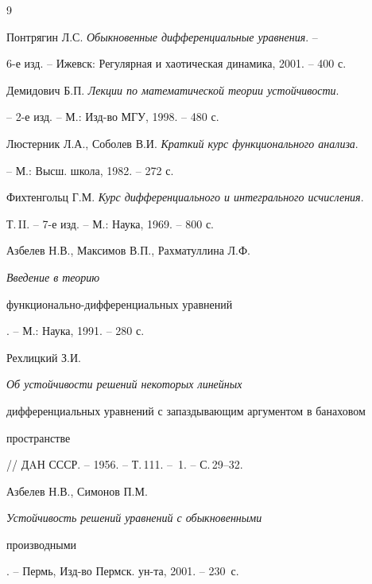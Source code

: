 \begin{thebibliography}{9} 


 




Понтрягин Л.С. {\em Обыкновенные дифференциальные уравнения}. -- 


6-е изд. -- Ижевск: Регулярная и хаотическая динамика, 2001. -- 400 с. 




Демидович Б.П. {\em Лекции по математической теории устойчивости}. 


-- 2-е изд. -- М.: Изд-во МГУ, 1998. -- 480 с. 




Люстерник Л.А., Соболев В.И. {\em Краткий курс функционального анализа}. 


-- М.: Высш. школа, 1982. -- 272 с. 




Фихтенгольц Г.М. {\em Курс дифференциального и интегрального исчисления}. 


Т.\,II. -- 7-е изд. -- М.: Наука, 1969. -- 800 с. 




Азбелев Н.В., Максимов В.П., Рахматуллина Л.Ф. {\em Введение в теорию 


функционально-дифференциальных уравнений}. -- М.: Наука, 1991. -- 280 с. 




Рехлицкий З.И. {\em Об устойчивости решений некоторых линейных 


дифференциальных уравнений с запаздывающим аргументом в банаховом 


пространстве} // ДAН СССР. -- 1956. -- Т.\,111. -- \No\,1. -- С.\,29--32. 




Азбелев Н.В., Симонов П.М. {\em Устойчивость решений уравнений с обыкновенными


производными}. -- Пермь, Изд-во Пермск. ун-та, 2001. -- 230~с.


 


\end{thebibliography} 


 


\vskip 2cm 


 






 


\label{end} 


 


 


